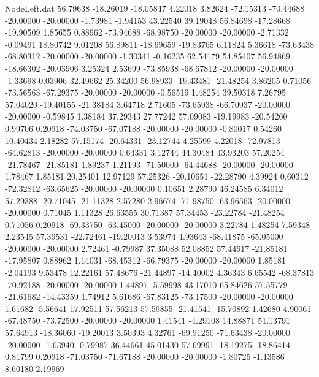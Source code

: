 \begin{filecontents}{NodeLeft.dat}
  56.79638  -18.26019  -18.05847     4.22018    3.82624  -72.15313  -70.44688  -20.00000  -20.00000   -1.73981   -1.94153   43.22540   39.19048
  56.84698  -17.28668  -19.90509     1.85655    0.88962  -73.94688  -68.98750  -20.00000  -20.00000   -2.71332   -0.09491   18.80742    9.01208
  56.89811  -18.69659  -19.83765     6.11824    5.36618  -73.63438  -68.80312  -20.00000  -20.00000   -1.30341   -0.16235   62.54179   54.85407
  56.94869  -18.66302  -20.03906     3.25324    2.53699  -73.85938  -68.67812  -20.00000  -20.00000   -1.33698    0.03906   32.49662   25.34200
  56.98933  -19.43481  -21.48254     3.86205    0.71056  -73.56563  -67.29375  -20.00000  -20.00000   -0.56519    1.48254   39.50318    7.26795
  57.04020  -19.40155  -21.38184     3.64718    2.71605  -73.65938  -66.70937  -20.00000  -20.00000   -0.59845    1.38184   37.29343   27.77242
  57.09083  -19.19983  -20.54260     0.99706    0.20918  -74.03750  -67.07188  -20.00000  -20.00000   -0.80017    0.54260   10.40434    2.18282
  57.15174  -20.64331  -23.12744     4.25599    4.22018  -72.97813  -64.62813  -20.00000  -20.00000    0.64331    3.12744   44.30484   43.93203
  57.20254  -21.78467  -21.85181     1.89237    1.21193  -71.50000  -64.44688  -20.00000  -20.00000    1.78467    1.85181   20.25401   12.97129
  57.25326  -20.10651  -22.28790     4.39924    0.60312  -72.32812  -63.65625  -20.00000  -20.00000    0.10651    2.28790   46.24585    6.34012
  57.29388  -20.71045  -21.11328     2.57280    2.96674  -71.98750  -63.96563  -20.00000  -20.00000    0.71045    1.11328   26.63555   30.71387
  57.34453  -23.22784  -21.48254     0.71056    0.20918  -69.33750  -63.45000  -20.00000  -20.00000    3.22784    1.48254    7.59348    2.23545
  57.39531  -22.72461  -19.20013     3.53974    4.93643  -68.41875  -65.05000  -20.00000  -20.00000    2.72461   -0.79987   37.35088   52.08852
  57.44617  -21.85181  -17.95807     0.88962    1.14031  -68.45312  -66.79375  -20.00000  -20.00000    1.85181   -2.04193    9.53478   12.22161
  57.48676  -21.44897  -14.40002     4.36343    6.65542  -68.37813  -70.92188  -20.00000  -20.00000    1.44897   -5.59998   43.17010   65.84626
  57.55779  -21.61682  -14.43359     1.74912    5.61686  -67.83125  -73.17500  -20.00000  -20.00000    1.61682   -5.56641   17.92511   57.56213
  57.59855  -21.41541  -15.70892     1.42680    4.90061  -67.48750  -73.72500  -20.00000  -20.00000    1.41541   -4.29108   14.88871   51.13791
  57.64913  -18.36060  -19.20013     3.50393    4.32761  -69.91250  -71.63438  -20.00000  -20.00000   -1.63940   -0.79987   36.44661   45.01430
  57.69991  -18.19275  -18.86414     0.81799    0.20918  -71.03750  -71.67188  -20.00000  -20.00000   -1.80725   -1.13586    8.60180    2.19969

\end{filecontents}
